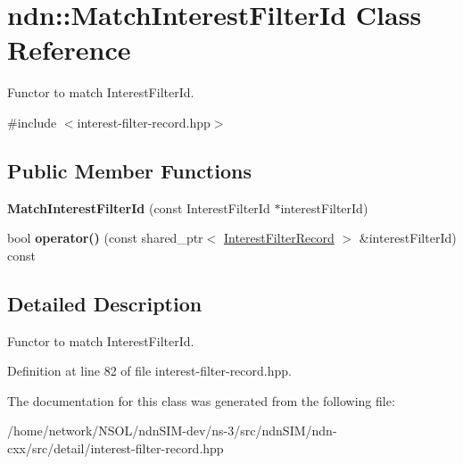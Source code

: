 \hypertarget{classndn_1_1MatchInterestFilterId}{}\section{ndn\+:\+:Match\+Interest\+Filter\+Id Class Reference}
\label{classndn_1_1MatchInterestFilterId}


Functor to match Interest\+Filter\+Id.  




{\ttfamily \#include $<$interest-\/filter-\/record.\+hpp$>$}

\subsection*{Public Member Functions}
\begin{DoxyCompactItemize}
\item 
{\bfseries Match\+Interest\+Filter\+Id} (const Interest\+Filter\+Id $\ast$interest\+Filter\+Id)\hypertarget{classndn_1_1MatchInterestFilterId_aa5000c8e3f494a5eb20c8b1d9701f2e6}{}\label{classndn_1_1MatchInterestFilterId_aa5000c8e3f494a5eb20c8b1d9701f2e6}

\item 
bool {\bfseries operator()} (const shared\+\_\+ptr$<$ \hyperlink{classndn_1_1InterestFilterRecord}{Interest\+Filter\+Record} $>$ \&interest\+Filter\+Id) const\hypertarget{classndn_1_1MatchInterestFilterId_ad70fbff7b3b852bf7420e3ba5549b320}{}\label{classndn_1_1MatchInterestFilterId_ad70fbff7b3b852bf7420e3ba5549b320}

\end{DoxyCompactItemize}


\subsection{Detailed Description}
Functor to match Interest\+Filter\+Id. 

Definition at line 82 of file interest-\/filter-\/record.\+hpp.



The documentation for this class was generated from the following file\+:\begin{DoxyCompactItemize}
\item 
/home/network/\+N\+S\+O\+L/ndn\+S\+I\+M-\/dev/ns-\/3/src/ndn\+S\+I\+M/ndn-\/cxx/src/detail/interest-\/filter-\/record.\+hpp\end{DoxyCompactItemize}
